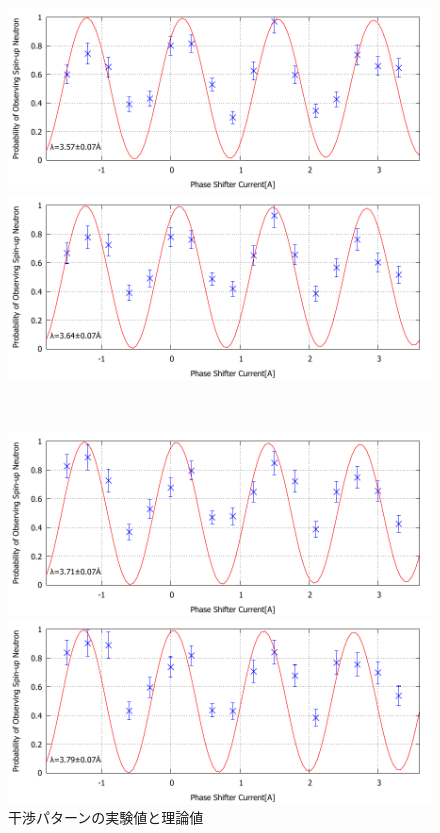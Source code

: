 \begin{figure}[h]
\begin{minipage}{0.5\hsize}
\end{minipage}\\
\begin{minipage}{0.5\hsize}
\includegraphics[width=\hsize]{analysis/GO/IT_e_500.pdf}
\end{minipage}
\begin{minipage}{0.5\hsize}
\includegraphics[width=\hsize]{analysis/GO/IT_e_510.pdf}
\end{minipage}\\
\begin{minipage}{0.5\hsize}
\includegraphics[width=\hsize]{analysis/GO/IT_e_520.pdf}
\end{minipage}
\begin{minipage}{0.5\hsize}
\includegraphics[width=\hsize]{analysis/GO/IT_e_530.pdf}
\end{minipage}
\caption{干渉パターンの実験値と理論値}\label{analysis_fig_IT_e}
\end{figure}
